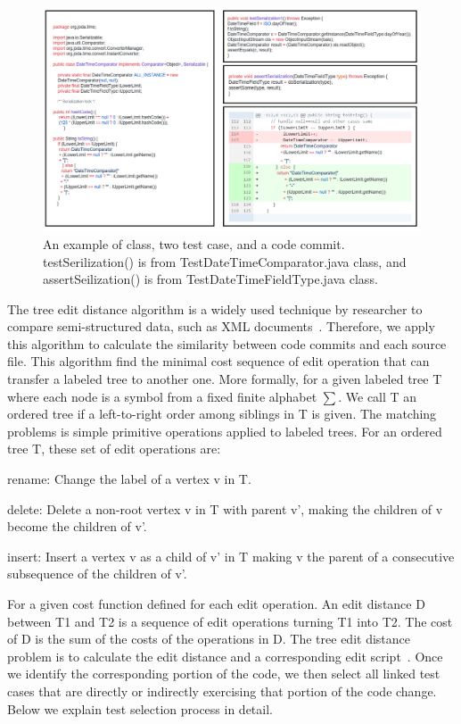 \begin{figure}[!ht]
	\centering
	\includegraphics[width=0.90\linewidth]{./allcodes2.png}
	\vspace*{-3pt}
	\caption{An example of class, two test case, and a code commit. 
		testSerilization() is 
		from TestDateTimeComparator.java class, and assertSeilization() is from
		TestDateTimeFieldType.java class.}
	\label{fig:class}
\end{figure}

The tree edit distance algorithm is a widely used technique 
by researcher to compare semi-structured data,
such as XML documents~\cite{xml, treeedit}. 
Therefore, we apply this algorithm to 
calculate the similarity between code commits and each source file.
This algorithm find the minimal cost 
sequence of edit operation that can transfer a labeled tree
to another one. 
More formally, for a given labeled tree T where each node 
is a symbol from a fixed finite alphabet $\sum$.
We call T an ordered tree if a left-to-right
order among siblings in T is given. The matching problems is
simple primitive operations applied to labeled trees. 
For an ordered tree T, these set of edit operations are:

\begin{smallitem}
	\item{rename:} Change the label of a vertex v in T.
	\item{delete:} Delete a non-root vertex v in T with parent v', 
	making the children of v become the children of v'.
	\item{insert:} Insert a vertex v as a child of v'
	in T making v the parent of a consecutive subsequence of the children of v'.
	
\end{smallitem}

For a given cost function defined for
each edit operation. An edit distance D 
between T1 and T2 is a sequence of edit
operations turning T1 into T2. 
The cost of D is the sum of the costs of the
operations in D. The tree edit distance problem is to 
calculate the edit distance and a corresponding edit script~\cite{treeedit}.
Once we identify the corresponding portion of the code, 
we then select all linked test cases that are directly or indirectly 
exercising that portion of the code change.
Below we explain test selection process in detail.

